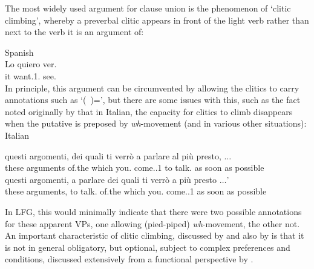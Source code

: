 \documentclass[output=paper,hidelinks]{langscibook}
\begin{document}
The most widely used argument for clause union is
the phenomenon of
`clitic climbing', whereby a preverbal clitic appears in front of the light verb rather
than next to the verb it is an argument of:

\ea Spanish\\
\gll Lo quiero ver.\\
it want.{1.\SG} see.{\INF}\\
\z
In principle, this argument can be circumvented by allowing the clitics to carry annotations
such as `(\UP\XCOMP*~\OBJ)=\DOWN', but there are some issues with this, such as the
fact noted originally by \citet[120]{Rizzi1978} that in Italian, the capacity for clitics to climb
disappears when the putative {\XCOMP} is preposed by \emph{wh}-movement (and in various other
situations):
\ea Italian
\begin{xlist}
\ex
\gll questi argomenti, dei quali ti verr\`o a parlare {al pi\`u presto}, $\dots$\\
these arguments of.the which you.{\DAT} come.{\FUT.1\SG} to talk.{\INF} {as soon as possible}\\
\ex
\gll *questi argomenti, a parlare dei quali ti verr\`o {a pi\`u presto} $\ldots$'\\
these arguments, to talk.{\INF} of.the which you.{\DAT} come.{\FUT.1\SG} {as soon as possible}\\
\end{xlist}
\z
In LFG, this would minimally indicate that there were two possible annotations for these
apparent VPs, one allowing (pied-piped) \emph{wh}-movement, the other not. An important
characteristic of clitic climbing, discussed by \citet{Sheehan2016} and also by
\citet{AndrewsManning1993} is that it is not in general obligatory, but optional, subject
to complex preferences and conditions, discussed extensively from a functional perspective
by \citet{Garcia2009}.
\end{document}
